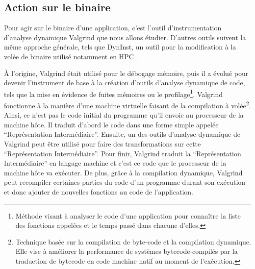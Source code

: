 \subsection{Action sur le binaire}
\label{subsubsection:valgrind}

Pour agir sur le binaire d'une application, c'est l'outil d'instrumentation
d'analyse dynamique Valgrind \citep{Valgrind, Valgrindweb} que nous allons
étudier. D'autres outils suivent la même approche générale, tels que DynInst, un outil pour la modification à la volée de binaire utilisé notamment en HPC \citep{Dyn}.

À l'origine, Valgrind était utilisé pour le débogage mémoire, puis il a évolué
pour devenir l'instrument de base à la création d'outils d'analyse dynamique de
code, tels que la mise en évidence de fuites mémoires ou le
profilage\footnote{Méthode visant à analyser le code d'une application pour
connaître la liste des fonctions appelées et le temps passé dans chacune
d'elles.}. Valgrind fonctionne à la manière d'une machine virtuelle faisant de la
compilation à volée\footnote{Technique basée sur la compilation de byte-code et
la compilation dynamique. Elle vise à améliorer la performance de systèmes
bytecode-compilés par la traduction de bytecode en code machine natif au moment
de l'exécution.}. Ainsi, ce n'est pas le code initial du programme qu'il envoie
au processeur de la machine hôte. Il traduit d'abord le code dans une forme
simple appelée ``Représentation Intermédiaire''. Ensuite, un des outils
d'analyse dynamique de Valgrind peut être utilisé pour faire des transformations
sur cette ``Représentation Intermédiaire''. Pour finir, Valgrind traduit la
``Représentation Intermédiaire'' en langage machine et c'est ce code que le
processeur de la machine hôte va exécuter. De plus, grâce à la compilation
dynamique, Valgrind peut recompiler certaines parties du code d'un programme
durant son exécution et donc ajouter de nouvelles fonctions au code de
l'application.

